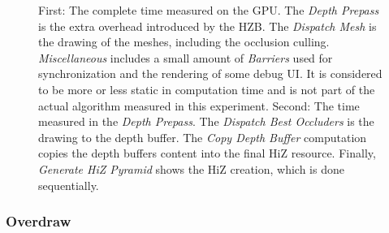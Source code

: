 \begin{figure}[!htb]
  \caption{First: The complete time measured on the \ac{GPU}. The \emph{Depth Prepass} is the extra overhead 
  introduced by the \ac{HZB}. The \emph{Dispatch Mesh} is the drawing of the meshes, including the occlusion 
  culling. \emph{Miscellaneous} includes a small amount of \emph{Barriers} used for synchronization and the 
  rendering of some debug \ac{UI}. It is considered to be more or less static in computation time and is not 
  part of the actual algorithm measured in this experiment. Second: The time measured in the \emph{Depth Prepass}. 
  The \emph{Dispatch Best Occluders} is the drawing to the depth buffer. The \emph{Copy Depth Buffer} computation 
  copies the depth buffers content into the final \ac{HiZ} resource. Finally, \emph{Generate HiZ Pyramid} shows 
  the \ac{HiZ} creation, which is done sequentially.}
  \label{fig:torus-gpu-results}
\end{figure}

\subsubsection*{Overdraw}

